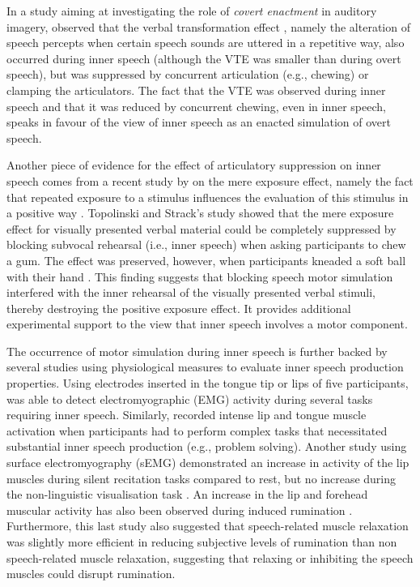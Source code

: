\documentclass[12pt,]{book}
\theoremstyle{definition}
\theoremstyle{definition}
\theoremstyle{definition}
\theoremstyle{remark}
\begin{document}
In a study aiming at investigating the role of \emph{covert enactment}
in auditory imagery, \citet{Reisberg1989} observed that the verbal
transformation effect \citep[VTE,][]{Warren1958}, namely the alteration
of speech percepts when certain speech sounds are uttered in a
repetitive way, also occurred during inner speech (although the VTE was
smaller than during overt speech), but was suppressed by concurrent
articulation (e.g., chewing) or clamping the articulators. The fact that
the VTE was observed during inner speech and that it was reduced by
concurrent chewing, even in inner speech, speaks in favour of the view
of inner speech as an enacted simulation of overt speech.

Another piece of evidence for the effect of articulatory suppression on
inner speech comes from a recent study by \citet{Topolinski2009} on the
mere exposure effect, namely the fact that repeated exposure to a
stimulus influences the evaluation of this stimulus in a positive way
\citep{Zajonc1968}. Topolinski and Strack's study showed that the mere
exposure effect for visually presented verbal material could be
completely suppressed by blocking subvocal rehearsal (i.e., inner
speech) when asking participants to chew a gum. The effect was
preserved, however, when participants kneaded a soft ball with their
hand \citep{Topolinski2009}. This finding suggests that blocking speech
motor simulation interfered with the inner rehearsal of the visually
presented verbal stimuli, thereby destroying the positive exposure
effect. It provides additional experimental support to the view that
inner speech involves a motor component.

The occurrence of motor simulation during inner speech is further backed
by several studies using physiological measures to evaluate inner speech
production properties. Using electrodes inserted in the tongue tip or
lips of five participants, \citet{Jacobson1931} was able to detect
electromyographic (EMG) activity during several tasks requiring inner
speech. Similarly, \citet{Sokolov1972} recorded intense lip and tongue
muscle activation when participants had to perform complex tasks that
necessitated substantial inner speech production (e.g., problem
solving). Another study using surface electromyography (sEMG)
demonstrated an increase in activity of the lip muscles during silent
recitation tasks compared to rest, but no increase during the
non-linguistic visualisation task \citep{Livesay1996}. An increase in
the lip and forehead muscular activity has also been observed during
induced rumination \citep{Nalborczyk2017}. Furthermore, this last study
also suggested that speech-related muscle relaxation was slightly more
efficient in reducing subjective levels of rumination than non
speech-related muscle relaxation, suggesting that relaxing or inhibiting
the speech muscles could disrupt rumination.
\end{document}
